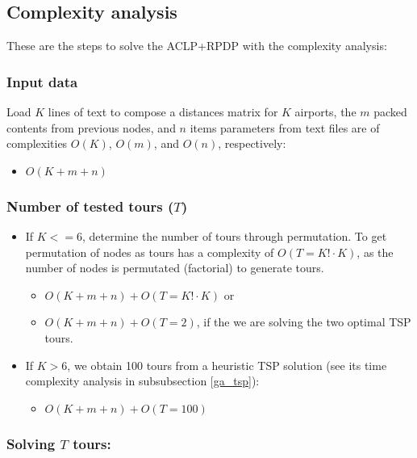 \documentclass[preprint,authoryear]{elsarticle}
\begin{document}
{\color{blue}
\subsection{Complexity analysis}


These are the steps to solve the ACLP+RPDP with the complexity analysis:

\subsubsection{Input data}

Load $K$ lines of text to compose a distances matrix for $K$ airports, the $m$ packed contents from previous nodes, and $n$ items parameters from text files are of complexities $O(K)$, $O(m)$, and $O(n)$, respectively:

	\begin{itemize}
		\item $O(K + m + n)$
	\end{itemize}


\subsubsection{Number of tested tours ($T$)}

\begin{itemize}
\item If $K <= 6$, determine the number of tours through permutation. To get permutation of nodes as tours has a complexity of $O(T = K! \cdot K)$, as the number of nodes is permutated (factorial) to generate tours.

	\begin{itemize}
	\item $ O(K + m + n) + O(T = K! \cdot K)$ or
	\item $ O(K + m + n) + O(T = 2)$, if the we are solving the two optimal TSP tours.
	\end{itemize}

\item If $K > 6$, we obtain 100 tours from a heuristic TSP solution (see its time complexity analysis in subsubsection \ref{ga_tsp}):

	\begin{itemize}
		\item $O(K + m + n) + O(T = 100)$
	\end{itemize}
\end{itemize}

\subsubsection{Solving $T$ tours:}

}
\end{document}

